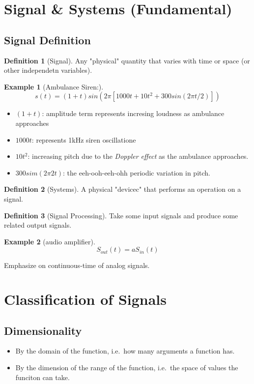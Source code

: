 \documentclass{article}
\theoremstyle{definition}
\newtheorem{definition}{Definition}[subsection]
\newtheorem{example}{Example}[section]
\begin{document}
\section{Signal \& Systems (Fundamental)}
\subsection{Signal Definition}
\begin{definition}[Signal]
    Any "physical" quantity that varies with time or space (or other independetn variables).
\end{definition}
\begin{example}[Ambulance Siren:]
    \begin{equation}
        s(t) = (1+t)sin(2\pi [1000t+10t^2+300sin(2\pi t /2)]) 
    \end{equation}
    \begin{itemize}
        \item $ (1+t) $: amplitude term represents incresing loudness as ambulance approaches
        \item $ 1000t $: represents 1kHz siren oscillatione
        \item $ 10t^2 $: increasing pitch due to the \emph{Doppler effect} as the ambulance approaches.
        \item $ 300sim(2\pi 2t) $: the eeh-ooh-eeh-ohh periodic variation in pitch.
    \end{itemize} 
\end{example}

\begin{definition}[Systems]
    A physical "devicec" that performs an operation on a signal.
\end{definition}
\begin{definition}[Signal Processing]
    Take some input signals and produce some related output signals.
\end{definition}
\begin{example}[audio amplifier]
    \begin{equation}
        S_{out}(t) = aS_{in}(t)
    \end{equation}
\end{example}
Emphasize on continuous-time of analog signals.
\section{Classification of Signals}
\subsection{Dimensionality}
\begin{itemize}
    \item By the domain of the function, i.e.\ how many arguments a function has.
    \item By the dimension of the range of the function, i.e.\ the space of values the funciton can take.
\end{itemize}
\end{document}
